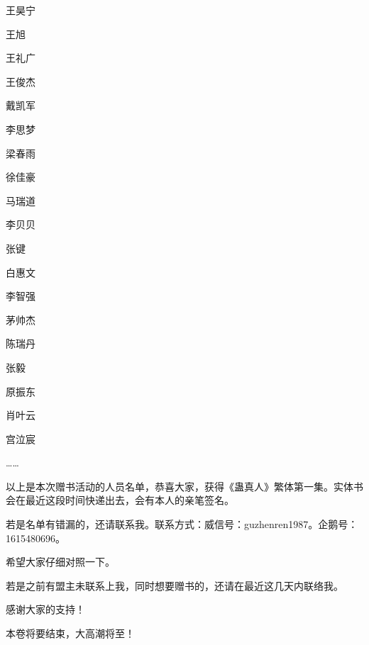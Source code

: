 \begin{this_body}
王昊宁

王旭

王礼广

王俊杰

戴凯军

李思梦

梁春雨

徐佳豪

马瑞道

李贝贝

张键

白惠文

李智强

茅帅杰

陈瑞丹

张毅

原振东

肖叶云

宫泣宸

……

以上是本次赠书活动的人员名单，恭喜大家，获得《蛊真人》繁体第一集。实体书会在最近这段时间快递出去，会有本人的亲笔签名。

若是名单有错漏的，还请联系我。联系方式：威信号：guzhenren1987。企鹅号：1615480696。

希望大家仔细对照一下。

若是之前有盟主未联系上我，同时想要赠书的，还请在最近这几天内联络我。

感谢大家的支持！

本卷将要结束，大高潮将至！

\end{this_body}


